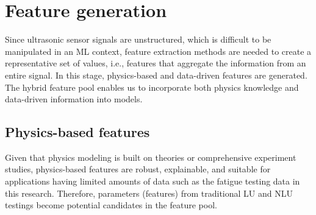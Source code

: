 \section{Feature generation}
Since ultrasonic sensor signals are unstructured, which is difficult to be manipulated in an ML context, feature extraction methods are needed to create a representative set of values, i.e., features that aggregate the information from an entire signal. In this stage, physics-based and data-driven features are generated. The hybrid feature pool enables us to incorporate both physics knowledge and data-driven information into models.

\subsection{Physics-based features}
Given that physics modeling is built on theories or comprehensive experiment studies, physics-based features are robust, explainable, and suitable for applications having limited amounts of data such as the fatigue testing data in this research. Therefore, parameters (features) from traditional LU and NLU testings become potential candidates in the feature pool.
